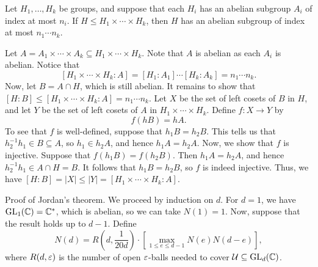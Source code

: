 \begin{lemma}{}
    Let $H_1, \dots, H_k$ be groups, and suppose that each $H_i$ has an 
    abelian subgroup $A_i$ of index at most $n_i$. If $H \leq H_1 \times 
    \cdots \times H_k$, then $H$ has an abelian subgroup of index at most 
    $n_1 \cdots n_k$. 
\end{lemma}
\begin{pf}
    Let $A = A_1 \times \cdots \times A_k \subseteq H_1 \times \cdots \times H_k$. 
    Note that $A$ is abelian as each $A_i$ is abelian. Notice that 
    \[ [H_1 \times \cdots \times H_k : A] = [H_1 : A_1] \cdots [H_k : A_k] 
    = n_1 \cdots n_k. \] 
    Now, let $B = A \cap H$, which is still abelian. It remains to show that 
    $[H : B] \leq [H_1 \times \cdots \times H_k : A] = n_1 \cdots n_k$. 
    Let $X$ be the set of left cosets of $B$ in $H$, and let $Y$ be the 
    set of left cosets of $A$ in $H_1 \times \cdots \times H_k$. Define 
    $f : X \to Y$ by 
    \[ f(hB) = hA. \] 
    To see that $f$ is well-defined, suppose that $h_1B = h_2B$. This tells us 
    that $h_2^{-1}h_1 \in B \subseteq A$, so $h_1 \in h_2A$, and hence 
    $h_1A = h_2A$. Now, we show that $f$ is injective. Suppose that 
    $f(h_1B) = f(h_2B)$. Then $h_1A = h_2A$, and hence $h_2^{-1}h_1 \in A 
    \cap H = B$. It follows that $h_1B = h_2B$, so $f$ is indeed injective. 
    Thus, we have $[H : B] = |X| \leq |Y| = [H_1 \times \cdots \times H_k 
    : A]$. 
\end{pf}

{\sc Proof of Jordan's theorem.} We proceed by induction on $d$. For 
$d = 1$, we have $\operatorname{GL}_1(\mathbb{C}) = \mathbb{C}^*$, which is abelian, so we can take 
$N(1) = 1$. Now, suppose that the result holds up to $d-1$. Define 
\[ N(d) = R\left(d, \frac{1}{20d}\right) \cdot \left[ \max_{1\leq e\leq d-1} 
N(e) N(d-e) \right], \] 
where $R(d, \varepsilon)$ is the number of open $\varepsilon$-balls needed to cover 
${\cal U} \subseteq \operatorname{GL}_d(\mathbb{C})$. 

